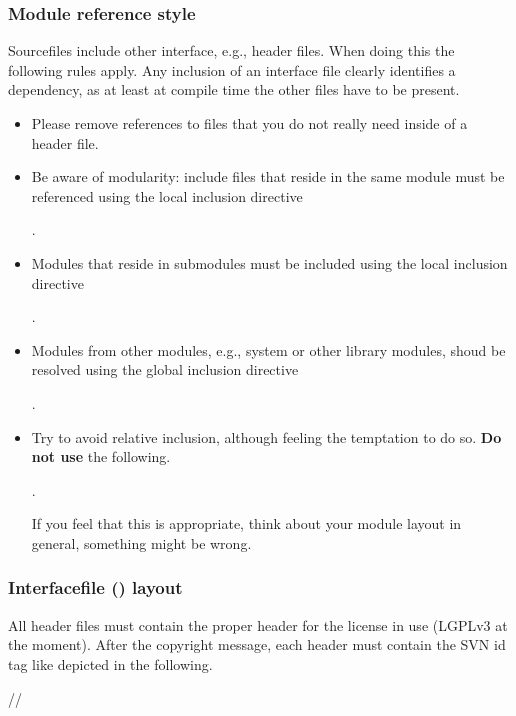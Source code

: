 \subsubsection{Module reference style}
Sourcefiles include other interface, e.g., header files.
When doing this the following rules apply.
Any inclusion of an interface file clearly identifies a dependency, as at least at compile time the other files have to be present.
\begin{itemize}
\item Please remove references to files that you do not really need inside of a header file.
\item Be aware of modularity: include files that reside in the same module must be referenced using the local inclusion directive 

.
\item Modules that reside in submodules must be included using the local inclusion directive 

.
\item Modules from other modules, e.g., system or other library modules, shoud be resolved using the global inclusion directive 

.
\item Try to avoid relative inclusion, although feeling the temptation to do so. \textbf{Do not use} the following.

.

If you feel that this is appropriate, think about your module layout in general, something might be wrong.
\end{itemize}

\subsubsection{Interfacefile () layout}
All header files must contain the proper header for the license in use (LGPLv3 at the moment).
After the copyright message, each header must contain the SVN id tag like depicted in the following.

// 

